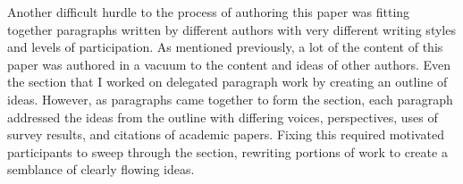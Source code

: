 
Another difficult hurdle to the process of authoring this paper was fitting together paragraphs written by different authors with very different writing styles and levels of participation. As mentioned previously, a lot of the content of this paper was authored in a vacuum to the content and ideas of other authors. Even the section that I worked on delegated paragraph work by creating an outline of ideas. However, as paragraphs came together to form the section, each paragraph addressed the ideas from the outline with differing voices, perspectives, uses of survey results, and citations of academic papers. Fixing this required motivated participants to sweep through the section, rewriting portions of work to create a semblance of clearly flowing ideas.
